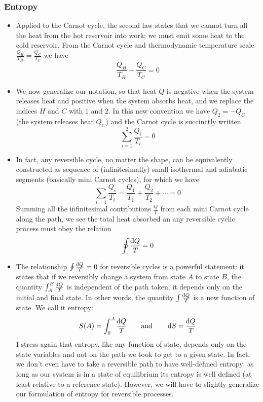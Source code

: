 \documentclass[11pt, a4paper]{article}
\newcommand{\eqtext}[1]{\qquad \text{#1} \qquad}
\newcommand{\diff}{\mathop{}\!\mathrm{d}} %
\newcommand{\dbar}{{\mathchar '26\mkern -11mu \mathrm{d}}} %
\begin{document}
\subsubsection{Entropy}
\begin{itemize}
	\item Applied to the Carnot cycle, the second law states that we cannot turn all the heat from the hot reservoir into work; we must emit some heat to the cold reservoir. From the Carnot cycle and thermodynamic temperature scale $ \frac{Q_{H}}{T_{H}} = \frac{Q_{C}}{T_{C}} $ we have
	\begin{equation*}
		\frac{Q_{H}}{T_{H}} - \frac{Q_{C}}{T_{C}} = 0
	\end{equation*}
	
	\item We now generalize our notation, so that heat $ Q $ is negative when the system releases heat and positive when the system absorbs heat, and we replace the indices $ H $ and $ C $ with $ 1 $ and $ 2 $. In this new convention we have $ Q_{2} = - Q_{C} $ (the system releases heat $ Q_{C} $) and the Carnot cycle is succinctly written
	\begin{equation*}
		\sum_{i=1}^{2} \frac{Q_{i}}{T_{i}} = 0
	\end{equation*}
	
	\item In fact, any reversible cycle, no matter the shape, can be equivalently constructed as sequence of (infinitesimally) small isothermal and adiabatic segments (basically mini Carnot cycles), for which we have
	\begin{equation*}
		\sum_{i=1} \frac{Q_{i}}{T_{i}} = \frac{Q_{1}}{T_{1}} + \frac{Q_{2}}{T_{2}} + \cdots = 0
	\end{equation*}
	Summing all the infinitesimal contributions $\frac{Q}{T}$ from each mini Carnot cycle along the path, we see the total heat absorbed an any reversible cyclic process must obey the relation
	\begin{equation*}
		\oint \frac{\dbar Q}{T} = 0
	\end{equation*}
	
	\item The relationship $ \oint \frac{\dbar Q}{T} = 0 $ for reversible cycles is a powerful statement: it states that if we reversibly change a system from state $ A $ to state $ B $, the quantity $ \int_{A}^{B} \frac{\dbar Q}{T} $ is independent of the path taken; it depends only on the initial and final state. In other words, the quantity $ \int \frac{\dbar Q}{T} $ is a new function of state. We call it entropy:
	\begin{equation*}
		S(A) = \int_{0}^{A} \frac{\dbar Q}{T} \eqtext{and} \diff S = \frac{\dbar Q}{T}
	\end{equation*}
	I stress again that entropy, like any function of state, depends only on the state variables and not on the path we took to get to a given state. In fact, we don't even have to take a reversible path to have well-defined entropy: as long as our system is in a state of equilibrium its entropy is well defined (at least relative to a reference state). However, we will have to slightly generalize our formulation of entropy for reversible processes.
	

\end{itemize}
\end{document}
